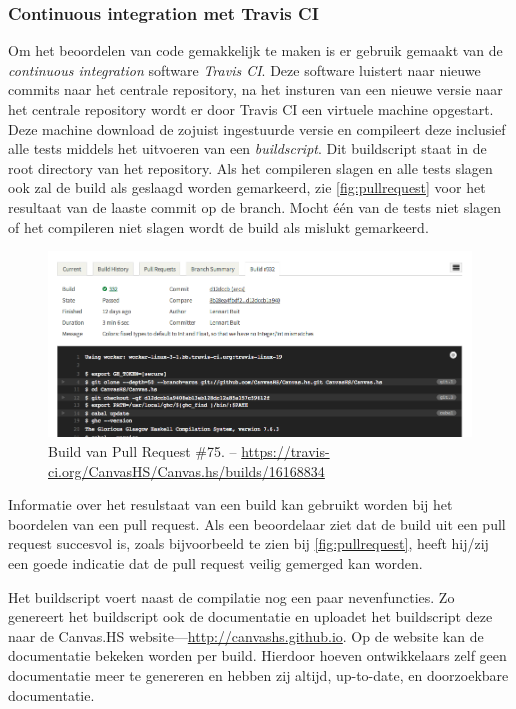 \subsubsection{Continuous integration met Travis CI}
Om het beoordelen van code gemakkelijk te maken is er gebruik gemaakt van de \emph{continuous integration} software \emph{Travis CI}. Deze software luistert naar nieuwe commits naar het centrale repository, na het insturen van een nieuwe versie naar het centrale repository wordt er door Travis CI een virtuele machine opgestart. Deze machine download de zojuist ingestuurde versie en compileert deze inclusief alle tests middels het uitvoeren van een \emph{buildscript}. Dit buildscript staat in de root directory van het repository. Als het compileren slagen en alle tests slagen ook zal de build als geslaagd worden gemarkeerd, zie \autoref{fig:pullrequest} voor het resultaat van de laaste commit op de  branch. Mocht één van de tests niet slagen of het compileren niet slagen wordt de build als mislukt gemarkeerd.

\begin{figure}[H]
\begin{center}
\includegraphics[keepaspectratio,width=\textwidth]{./images/travis.png}
\caption{Build van Pull Request \#75. – \url{https://travis-ci.org/CanvasHS/Canvas.hs/builds/16168834}}
\label{fig:travis}
\end{center}
\end{figure}

Informatie over het resulstaat van een build kan gebruikt worden bij het boordelen van een pull request. Als een beoordelaar ziet dat de build uit een pull request succesvol is, zoals bijvoorbeeld te zien bij \autoref{fig:pullrequest}, heeft hij/zij een goede indicatie dat de pull request veilig gemerged kan worden.

Het buildscript voert naast de compilatie nog een paar nevenfuncties. Zo genereert het buildscript ook de documentatie en uploadet het buildscript deze naar de Canvas.HS website—\url{http://canvashs.github.io}. Op de website kan de documentatie bekeken worden per build. Hierdoor hoeven ontwikkelaars zelf geen documentatie meer te genereren en hebben zij altijd, up-to-date, en doorzoekbare documentatie.

